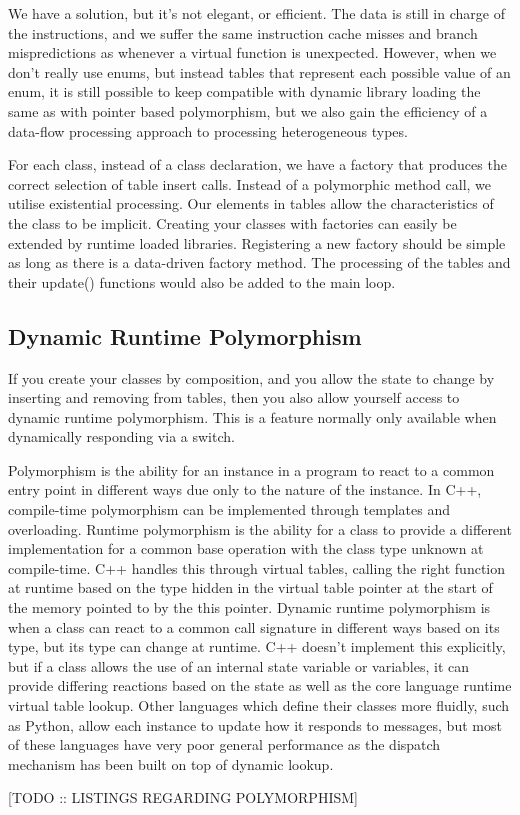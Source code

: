 \documentclass[a4paper,12pt]{book}
\begin{document}
We have a solution, but it's not elegant, or efficient.
The data is still in charge of the instructions, and we suffer the same instruction cache misses and branch mispredictions as whenever a virtual function is unexpected.
However, when we don't really use enums, but instead tables that represent each possible value of an enum, it is still possible to keep compatible with dynamic library loading the same as with pointer based polymorphism, but we also gain the efficiency of a data-flow processing approach to processing heterogeneous types.

For each class, instead of a class declaration, we have a factory that produces the correct selection of table insert calls.
Instead of a polymorphic method call, we utilise existential processing.
Our elements in tables allow the characteristics of the class to be implicit.
Creating your classes with factories can easily be extended by runtime loaded libraries.
Registering a new factory should be simple as long as there is a data-driven factory method.
The processing of the tables and their update() functions would also be added to the main loop.

\subsection{Dynamic Runtime Polymorphism}

If you create your classes by composition, and you allow the state to change by inserting and removing from tables, then you also allow yourself access to dynamic runtime polymorphism.
This is a feature normally only available when dynamically responding via a switch.

Polymorphism is the ability for an instance in a program to react to a common entry point in different ways due only to the nature of the instance.
In C++, compile-time polymorphism can be implemented through templates and overloading.
Runtime polymorphism is the ability for a class to provide a different implementation for a common base operation with the class type unknown at compile-time.
C++ handles this through virtual tables, calling the right function at runtime based on the type hidden in the virtual table pointer at the start of the memory pointed to by the this pointer.
Dynamic runtime polymorphism is when a class can react to a common call signature in different ways based on its type, but its type can change at runtime.
C++ doesn't implement this explicitly, but if a class allows the use of an internal state variable or variables, it can provide differing reactions based on the state as well as the core language runtime virtual table lookup.
Other languages which define their classes more fluidly, such as Python, allow each instance to update how it responds to messages, but most of these languages have very poor general performance as the dispatch mechanism has been built on top of dynamic lookup.

[TODO :: LISTINGS REGARDING POLYMORPHISM]
\end{document}
